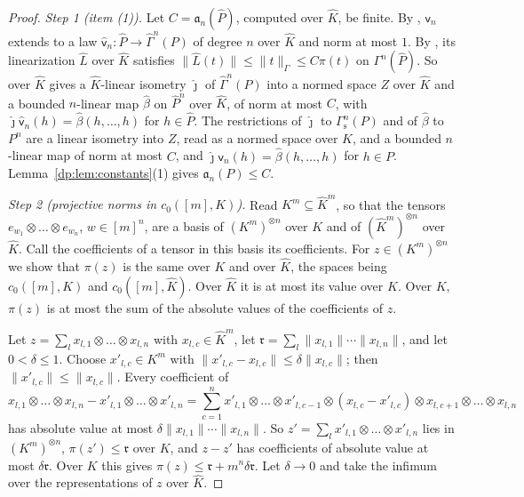 \documentclass[11pt]{amsart}
\theoremstyle{definition}
\theoremstyle{remark}
\numberwithin{equation}{section}
\newcommand{\norm}[1]{\lVert #1\rVert}
\newcommand{\Kh}{\widehat K}
\theoremstyle{plain}
\theoremstyle{definition}
\theoremstyle{plain}
\newcommand{\hGamma}{\widehat\Gamma}
\begin{document}
\begin{proof}
\emph{Step 1 (item (1)).} Let $C=\mathfrak a_n(\widehat P)$, computed over $\Kh$, be finite. By \cite[Lemma~Q.13(1)]{I}, $\mathsf v_n$ extends to a law $\hat{\mathsf v}_n\colon\widehat P\to\hGamma^n(P)$ of degree $n$ over $\Kh$ and norm at most $1$. By \cite[Lemma~Q.1(1)]{I}, its linearization $\hat L$ over $\Kh$ satisfies $\norm{\hat L(t)}\le\norm t_\Gamma\le C\pi(t)$ on $\Gamma^n(\widehat P)$. So \cite[Lemma~Q.1(4)]{I} over $\Kh$ gives a $\Kh$\nobreakdash-linear isometry $\hat\jmath$ of $\hGamma^n(P)$ into a normed space $Z$ over $\Kh$ and a bounded $n$\nobreakdash-linear map $\hat\beta$ on $\widehat P^n$ over $\Kh$, of norm at most $C$, with $\hat\jmath\hat{\mathsf v}_n(h)=\hat\beta(h,\dots,h)$ for $h\in\widehat P$. The restrictions of $\hat\jmath$ to $\Gamma^n_{\mathrm s}(P)$ and of $\hat\beta$ to $P^n$ are a linear isometry into $Z$, read as a normed space over $K$, and a bounded $n$\nobreakdash-linear map of norm at most $C$, and $\hat\jmath\mathsf v_n(h)=\hat\beta(h,\dots,h)$ for $h\in P$. Lemma~\ref{dp:lem:constants}(1) gives $\mathfrak a_n(P)\le C$.

\emph{Step 2 (projective norms in $c_0([m],K)$).} Read $K^m\subseteq\Kh^m$, so that the tensors $e_{w_1}\otimes\dots\otimes e_{w_n}$, $w\in[m]^n$, are a basis of $(K^m)^{\otimes n}$ over $K$ and of $(\Kh^m)^{\otimes n}$ over $\Kh$. Call the coefficients of a tensor in this basis its coefficients. For $z\in(K^m)^{\otimes n}$ we show that $\pi(z)$ is the same over $K$ and over $\Kh$, the spaces being $c_0([m],K)$ and $c_0([m],\Kh)$. Over $\Kh$ it is at most its value over $K$. Over $K$, $\pi(z)$ is at most the sum of the absolute values of the coefficients of $z$.

Let $z=\sum_lx_{l,1}\otimes\dots\otimes x_{l,n}$ with $x_{l,c}\in\Kh^m$, let $\mathfrak r=\sum_l\norm{x_{l,1}}\cdots\norm{x_{l,n}}$, and let $0<\delta\le1$. Choose $x'_{l,c}\in K^m$ with $\norm{x'_{l,c}-x_{l,c}}\le\delta\norm{x_{l,c}}$; then $\norm{x'_{l,c}}\le\norm{x_{l,c}}$. Every coefficient of
\[
 x_{l,1}\otimes\dots\otimes x_{l,n}-x'_{l,1}\otimes\dots\otimes x'_{l,n}
 =\sum_{c=1}^nx'_{l,1}\otimes\dots\otimes x'_{l,c-1}\otimes(x_{l,c}-x'_{l,c})\otimes x_{l,c+1}\otimes\dots\otimes x_{l,n}
\]
has absolute value at most $\delta\norm{x_{l,1}}\cdots\norm{x_{l,n}}$. So $z'=\sum_lx'_{l,1}\otimes\dots\otimes x'_{l,n}$ lies in $(K^m)^{\otimes n}$, $\pi(z')\le\mathfrak r$ over $K$, and $z-z'$ has coefficients of absolute value at most $\delta\mathfrak r$. Over $K$ this gives $\pi(z)\le\mathfrak r+m^n\delta\mathfrak r$. Let $\delta\to0$ and take the infimum over the representations of $z$ over $\Kh$.


\end{proof}
\end{document}
